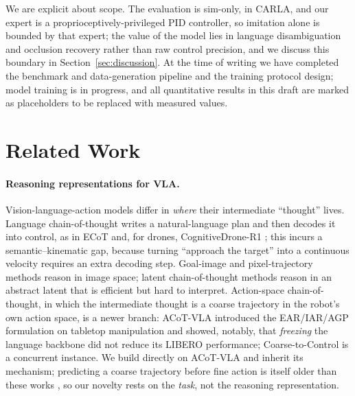 \documentclass[11pt]{article}
\begin{document}
We are explicit about scope. The evaluation is sim-only, in CARLA, and our
expert is a proprioceptively-privileged PID controller, so imitation alone
is bounded by that expert; the value of the model lies in language
disambiguation and occlusion recovery rather than raw control precision, and
we discuss this boundary in Section~\ref{sec:discussion}. At the time of
writing we have completed the benchmark and data-generation pipeline and the
training protocol design; model training is in progress, and all
quantitative results in this draft are marked as placeholders to be replaced
with measured values.

\section{Related Work}
\label{sec:related}

\paragraph{Reasoning representations for VLA.}
Vision-language-action models differ in \emph{where} their intermediate
``thought'' lives. Language chain-of-thought writes a natural-language plan
and then decodes it into control, as in ECoT \citep{ecot} and, for drones,
CognitiveDrone-R1 \citep{cognitivedrone}; this incurs a semantic--kinematic
gap, because turning ``approach the target'' into a continuous velocity
requires an extra decoding step. Goal-image and pixel-trajectory methods
\citep{cotvla,tracevla} reason in image space; latent chain-of-thought
methods \citep{lara,hyt,thinkact} reason in an abstract latent that is
efficient but hard to interpret. Action-space chain-of-thought, in which the
intermediate thought is a coarse trajectory in the robot's own action space,
is a newer branch: ACoT-VLA \citep{acotvla} introduced the EAR/IAR/AGP
formulation on tabletop manipulation and showed, notably, that
\emph{freezing} the language backbone did not reduce its LIBERO performance;
Coarse-to-Control \citep{coarse2control} is a concurrent instance. We build
directly on ACoT-VLA and inherit its mechanism; predicting a coarse
trajectory before fine action is itself older than these works
\citep{atm}, so our novelty rests on the \emph{task}, not the reasoning
representation.
\end{document}
